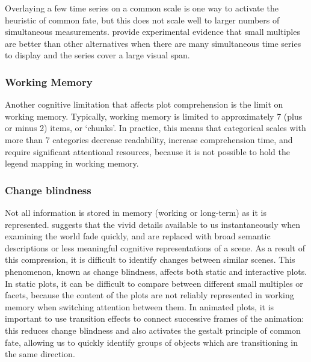 \documentclass[letterpaper]{ar-1col}\usepackage[]{graphicx}\usepackage[]{color}
\begin{document}
Overlaying a few time series on a common scale is one way to activate the heuristic of common fate, but this does not scale well to larger numbers of simultaneous measurements. \citet{javedGraphicalPerceptionMultiple2010a} provide experimental evidence that small multiples are better than other alternatives when there are many simultaneous time series to display and the series cover a large visual span.


\subsubsection{Working Memory}
Another cognitive limitation that affects plot comprehension is the limit on working memory. Typically, working memory is limited to approximately 7 (plus or minus 2) items, or `chunks'. In practice, this means that categorical scales with more than 7 categories decrease readability, increase comprehension time, and require significant attentional resources, because it is not possible to hold the legend mapping in working memory.

\subsubsection{Change blindness}
Not all information is stored in memory (working or long-term) as it is represented. \citet{simonsChangeBlindness1997} suggests that the vivid details available to us instantaneously when examining the world fade quickly, and are replaced with broad semantic descriptions or less meaningful cognitive representations of a scene. As a result of this compression, it is difficult to identify changes between similar scenes. This phenomenon, known as change blindness, affects both static and interactive plots. In static plots, it can be difficult to compare between different small multiples or facets, because the content of the plots are not reliably represented in working memory when switching attention between them. In animated plots, it is important to use transition effects to connect successive frames of the animation: this reduces change blindness and also activates the gestalt principle of common fate, allowing us to quickly identify groups of objects which are transitioning in the same direction.
\end{document}

